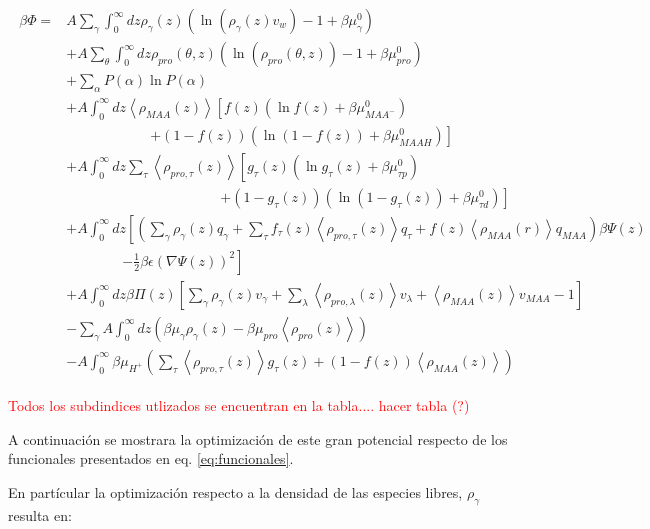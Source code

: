 \begin{align}
	\begin{aligned}
		\beta \Phi=  & A\sum_{\gamma}\int_0^\infty{dz\rho_\gamma(z)\left(\ln \left(\rho_\gamma (z)v_w\right) -1 + \beta\mu^0_\gamma\right)} \\
		&+ A\sum_{\theta}\int_0^\infty{dz\rho_{pro}(\theta,z)\left(\ln \left(\rho_{pro}(\theta,z)\right) -1 + \beta\mu^0_{pro} \right)} \\
		&+ \sum_\alpha{P(\alpha)\ln P(\alpha)} \\
		& + A\int_0^\infty dz \left<\rho_{MAA}(z)\right> \left[f(z)(\ln f(z)+ \beta\mu^0_{MAA^-})\right.\\
		& \qquad\qquad\qquad \left.+(1-f(z))(\ln (1-f(z))+\beta\mu^0_{MAAH})\right] \\
		& + A\int_0^\infty dz \sum_\tau \left<\rho_{pro,\tau}(z)\right> \left[g_\tau(z)(\ln g_\tau(z)+ \beta\mu^0_{\tau p})\right.\\
		&\qquad \qquad \qquad\qquad \qquad\quad \left.+(1-g_\tau(z))(\ln (1-g_\tau(z))+\beta\mu^0_{\tau d})\right]   \\
		& +A\int_0^\infty dz \left[\left(\sum_{\gamma } {\rho_\gamma(z) q_\gamma + \sum_\tau{f_\tau(z) \left<\rho_{pro,\tau}(z)\right> q_\tau} +  f(z) \left<\rho_{MAA}(r)\right>q_{MAA}}\right)\beta\Psi(z) \right. \\ & \qquad \qquad \left.-\frac{1}{2}\beta\epsilon(\nabla\Psi(z))^2 \right] \\ 
		& +A \int_0^\infty dz\beta\Pi(z){\left[\sum_{\gamma}\rho_\gamma(z) v_\gamma + \sum_\lambda{\left<\rho_{pro,\lambda}(z)\right>v_\lambda} + \left<\rho_{MAA}(z)\right>v_{MAA} -1 \right]} \\
		&   -\sum_\gamma A\int_0^\infty dz \left(\beta \mu_\gamma \rho_\gamma(z) - \beta \mu_{pro} \left<\rho_{pro}(z)\right> \right)  \\
		&  -A\int_0^\infty \beta\mu_{H^+} \left( \sum_\tau\left< \rho_{pro,\tau}(z) \right>g_\tau(z) + (1-f(z)) \left< \rho_{MAA}(z) \right> \right )
	\end{aligned}
\end{align}
 
\textcolor{red}{Todos los subdindices utlizados se encuentran en la tabla.... hacer tabla (?)}

A continuaci\'on se mostrara la optimizaci\'on de este gran potencial respecto de los funcionales presentados en  eq. \ref{eq:funcionales}.

En part\'icular la optimizaci\'on respecto a la densidad de las especies libres, $\rho_\gamma$ resulta en:

